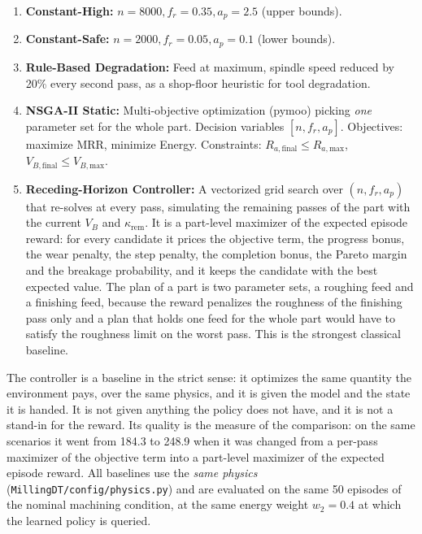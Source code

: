 \documentclass[11pt,a4paper]{article}
\newcommand{\MRR}{\mathrm{MRR}}
\newcommand{\RaMax}{R_{a,\text{max}}}
\newcommand{\RaFinal}{R_{a,\text{final}}}
\newcommand{\VB}{V_B}
\newcommand{\VBMax}{V_{B,\text{max}}}
\begin{document}
\begin{enumerate}
    \item \textbf{Constant-High:} $n=8000, f_r=0.35, a_p=2.5$ (upper bounds).
    \item \textbf{Constant-Safe:} $n=2000, f_r=0.05, a_p=0.1$ (lower bounds).
    \item \textbf{Rule-Based Degradation:} Feed at maximum, spindle speed reduced by 20\% every second pass, as a shop-floor heuristic for tool degradation.
    \item \textbf{NSGA-II Static:} Multi-objective optimization (pymoo) picking \textit{one} parameter set for the whole part. Decision variables $[n, f_r, a_p]$. Objectives: maximize $\MRR$, minimize Energy. Constraints: $\RaFinal \le \RaMax$, $V_{B,\text{final}} \le \VBMax$.
    \item \textbf{Receding-Horizon Controller:} A vectorized grid search over $(n, f_r, a_p)$ that re-solves at every pass, simulating the remaining passes of the part with the current $\VB$ and $\kappa_\text{rem}$. It is a part-level maximizer of the expected episode reward: for every candidate it prices the objective term, the progress bonus, the wear penalty, the step penalty, the completion bonus, the Pareto margin and the breakage probability, and it keeps the candidate with the best expected value. The plan of a part is two parameter sets, a roughing feed and a finishing feed, because the reward penalizes the roughness of the finishing pass only and a plan that holds one feed for the whole part would have to satisfy the roughness limit on the worst pass. This is the strongest classical baseline.
\end{enumerate}

The controller is a baseline in the strict sense: it optimizes the same quantity the environment pays, over the same physics, and it is given the model and the state it is handed. It is not given anything the policy does not have, and it is not a stand-in for the reward. Its quality is the measure of the comparison: on the same scenarios it went from 184.3 to 248.9 when it was changed from a per-pass maximizer of the objective term into a part-level maximizer of the expected episode reward. All baselines use the \textit{same physics} (\texttt{MillingDT/config/physics.py}) and are evaluated on the same 50 episodes of the nominal machining condition, at the same energy weight $w_2 = 0.4$ at which the learned policy is queried.

\end{document}
